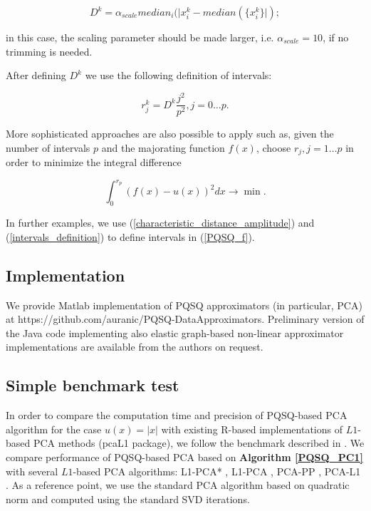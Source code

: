 \documentclass[preprint,12pt,twocolumn]{elsarticle}
\begin{document}
\begin{equation}\label{characteristic_distance_mad}
D^k = \alpha_{scale}median_i(|x_i^k-median(\{x_i^k\}|);
\end{equation}

\noindent in this case, the scaling parameter should be made larger, i.e. $\alpha_{scale}=10$, if no trimming is needed.

After defining $D^k$ we use the following definition of intervals:

\begin{equation}\label{intervals_definition}
r_j^k = D^k\frac{j^2}{p^2}, j=0\dots p.
\end{equation}

More sophisticated approaches are also possible to apply such as, given the number of intervals $p$ and the majorating function $f(x)$, choose $r_j, j=1\dots p$ in order to minimize the integral difference

$$
\int_0^{r_p}(f(x)-u(x))^2dx \rightarrow \min.
$$

In further examples, we use (\ref{characteristic_distance_amplitude}) and (\ref{intervals_definition}) to define intervals in (\ref{PQSQ_f}).

\subsection{Implementation}

We provide Matlab implementation of PQSQ approximators (in particular, PCA) at https://github.com/auranic/PQSQ-DataApproximators.
Preliminary version of the Java code implementing also elastic graph-based non-linear approximator implementations are available from
the authors on request.

%

\subsection{Simple benchmark test}

In order to compare the computation time and precision of PQSQ-based PCA algorithm for the case $u(x)=|x|$ with existing R-based implementations of $L1$-based PCA methods (pcaL1 package), we follow the benchmark described in \cite{brooks2012pcal1}. We compare performance of PQSQ-based PCA based on \textbf{Algorithm \ref{PQSQ_PC1}} with several $L1$-based PCA algorithms: L1-PCA* \cite{Brooks2013}, L1-PCA \cite{Ke2005}, PCA-PP \cite{Croux2007}, PCA-L1 \cite{Kwak2008}. As a reference point, we use the standard PCA algorithm based on quadratic norm and computed using the standard SVD iterations.
\end{document}
